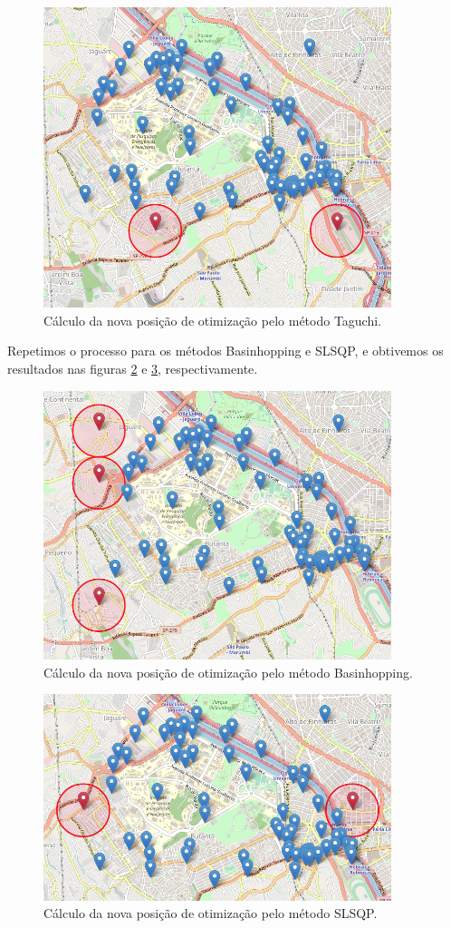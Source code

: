 \documentclass[]{politex}
\begin{document}
\begin{figure}[H]
    \centering
    \includegraphics[width=4in]{imagens/taguchi-exemplo}
    \caption{Cálculo da nova posição de otimização pelo método Taguchi.}
    \label{fig:taguchi_exemplo}
\end{figure}

Repetimos o processo para os métodos Basinhopping e SLSQP, e obtivemos os
resultados nas figuras \ref{fig:basinhopping_exemplo} e
\ref{fig:slsqp_exemplo}, respectivamente.

\begin{figure}[H]
    \centering
    \includegraphics[width=4in]{imagens/basinhopping-exemplo}
    \caption{Cálculo da nova posição de otimização pelo método Basinhopping.}
    \label{fig:basinhopping_exemplo}
\end{figure}

\begin{figure}[H]
    \centering
    \includegraphics[width=4in]{imagens/slsqp-exemplo}
    \caption{Cálculo da nova posição de otimização pelo método SLSQP.}
    \label{fig:slsqp_exemplo}
\end{figure}
\end{document}
